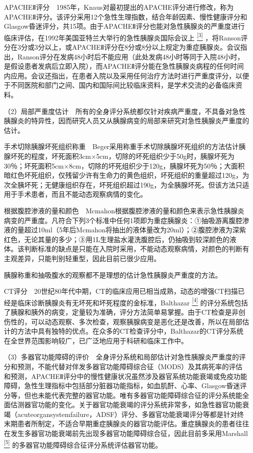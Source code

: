 APACHEⅡ评分　1985年，Knaus对最初提出的APACHE评分进行修改，称为APACHEⅡ评分。该评分采用12个急性生理指数，结合年龄因素、慢性健康评分和Glasgow昏迷评分，共15项。由于APACHEⅡ评分也能对急性胰腺炎的严重度进行临床评估，在1992年美国亚特兰大举行的急性胰腺炎国际会议上
\protect\hyperlink{text00021.htmlux5cux23ch3-20}{\textsuperscript{{[}3{]}}}
，将Ranson评分在3分或3分以上，或APACHEⅡ评分在8分或8分以上规定为重症胰腺炎。会议指出，Ranson评分在发病48小时后不能应用（此处发病48小时等同于入院48小时，是假设患者发病后立即入院），而APACHEⅡ评分能在急性胰腺炎病程的任何时间内应用。会议还指出，在患者入院以及采用任何治疗方法时进行严重度评分，以便于不同医院和部门之间、国内和国际间比较临床资料，是学术交流的必备临床资料。

（2）局部严重度估计　所有的全身评分系统都仅针对疾病严重度，不具备对急性胰腺炎的特异性，因而研究人员又从胰腺病变的局部来研究对急性胰腺炎严重度的估计。

手术切除胰腺坏死组织称重　Beger采用称重手术切除胰腺坏死组织的方法估计胰腺坏死的程度，坏死面积3cm×5cm，切除的坏死组织少于50g时，胰腺坏死为30％；坏死面积5cm×8cm，切除的坏死组织少于120g，胰腺坏死为50％；大面积暗红色坏死组织，仅残留少许有生命力的黄色组织，坏死组织的重量超过120g，为次全胰坏死；无健康组织存在，坏死组织超过190g，为全胰腺坏死。但该方法只适用于手术患者，而且不能动态观察病情的变化。

根据腹腔渗液的量和颜色　Mcmahon根据腹腔渗液的量和颜色来表示急性胰腺炎病变的严重度。凡符合下列3个标准中任何1项即为重症胰腺炎：①抽吸游离腹腔渗液的量超过10ml（5年后Mcmahon将抽出的液体量改为20ml）；②腹腔渗液为深紫红色，无论其量的多少；③用1L生理盐水灌洗腹腔后，仍抽吸到较深颜色的液体。该判断标准的缺点是只能在入院时采用，不能动态观察病情，对颜色的判断有主观差异，只能判别轻重型，因此目前已很少应用。

胰腺称重和抽吸腹水的观察都不是理想的估计急性胰腺炎严重度的方法。

CT评分　20世纪80年代中期，CT的临床应用已相当成熟，动态的增强CT扫描已经是临床诊断胰腺炎有无坏死和坏死程度的金标准，Balthazar
\protect\hyperlink{text00021.htmlux5cux23ch4-20}{\textsuperscript{{[}4{]}}}
的评分系统包括了胰腺和胰外的病变，定量较为准确，评分方法简单易掌握。由于CT检查是非创伤性的，可以动态观察、多次检查，观察胰腺病变是恶化还是改善，所以在局部估计的方法中具有独特的优点。在众多的CT检查评分中，Balthazar的CT评分系统在全世界范围影响较广，已广泛地应用于科研和临床工作中。

（3）多器官功能障碍的评价　全身评分系统和局部估计对急性胰腺炎严重度的评分和预测，不能代替对伴发多器官功能障碍综合征（MODS）及其病死率的评估和预测，APACHEⅡ评分中的慢性健康状况虽然涉及器官系统功能衰竭或免疫功能障碍，急性生理指标中包括部分脏器功能指标，如血肌酐、心率、Glasgow昏迷评分等，但也未能代表完整的器官功能。唯有多器官功能障碍综合征的评分系统能全面估测器官功能的变化。关于器官功能衰竭的评分系统非常多，如急性器官功能衰竭（acuteorgansystemfailure，ADSF）评分、多器官功能衰竭评分等都是针对终末期患者所制定，不适合早期重症胰腺炎的器官功能评估。重症胰腺炎的患者往往在发生多器官功能衰竭前先出现多器官功能障碍综合征，因此目前多采用Marshall
\protect\hyperlink{text00021.htmlux5cux23ch5-20}{\textsuperscript{{[}5{]}}}
的多器官功能障碍综合征评分系统评估器官功能。

